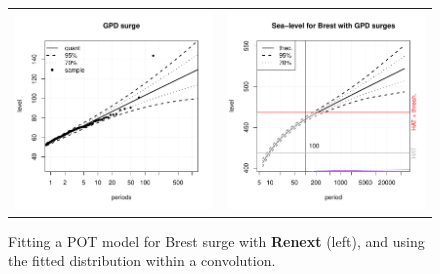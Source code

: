 \documentclass[11pt,a4paper]{report}\usepackage[]{graphicx}\usepackage[]{color}
\begin{document}
\begin{figure}
   \centering
   \begin{tabular}{c c} 
     \includegraphics[width=7.4cm]{Rgraphics/figBrestFitSurge-1.pdf} &
     \includegraphics[width=7.4cm]{Rgraphics/figBrestConv1-1.pdf}  
   \end{tabular}
   \caption{\label{BrestSurge} Fitting a POT model for Brest surge with \textbf{Renext} (left),
     and using the fitted distribution within a convolution.
   }
\end{figure}
\end{document}

